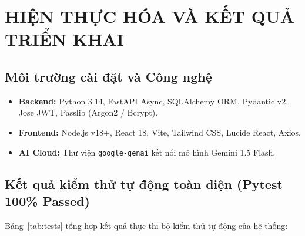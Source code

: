 \chapter{HIỆN THỰC HÓA VÀ KẾT QUẢ TRIỂN KHAI}

\section{Môi trường cài đặt và Công nghệ}
\begin{itemize}
    \item \textbf{Backend:} Python 3.14, FastAPI Async, SQLAlchemy ORM, Pydantic v2, Jose JWT, Passlib (Argon2 / Bcrypt).
    \item \textbf{Frontend:} Node.js v18+, React 18, Vite, Tailwind CSS, Lucide React, Axios.
    \item \textbf{AI Cloud:} Thư viện \texttt{google-genai} kết nối mô hình Gemini 1.5 Flash.
\end{itemize}

\section{Kết quả kiểm thử tự động toàn diện (Pytest 100\% Passed)}
Bảng~\ref{tab:tests} tổng hợp kết quả thực thi bộ kiểm thử tự động của hệ thống:

